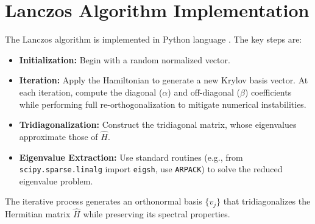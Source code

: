 \documentclass[12pt,a4paper]{report}
\begin{document}
\section{Lanczos Algorithm Implementation}
The Lanczos algorithm is implemented in Python language \cite{golub13, Press2007}. The key steps are:
\begin{itemize}
    \item \textbf{Initialization:} Begin with a random normalized vector.
    \item \textbf{Iteration:} Apply the Hamiltonian to generate a new Krylov basis vector. At each iteration, compute the diagonal ($\alpha$) and off-diagonal ($\beta$) coefficients while performing full re-orthogonalization to mitigate numerical instabilities.
    \item \textbf{Tridiagonalization:} Construct the tridiagonal matrix, whose eigenvalues approximate those of $\hat{H}$.
    \item \textbf{Eigenvalue Extraction:} Use standard routines (e.g., from \texttt{scipy.sparse.linalg} import \texttt{eigsh}, use \texttt{ARPACK}) to solve the reduced eigenvalue problem.
\end{itemize}
The iterative process generates an orthonormal basis $\{v_j\}$ that tridiagonalizes the Hermitian matrix $\hat{H}$ while preserving its spectral properties.
\end{document}
